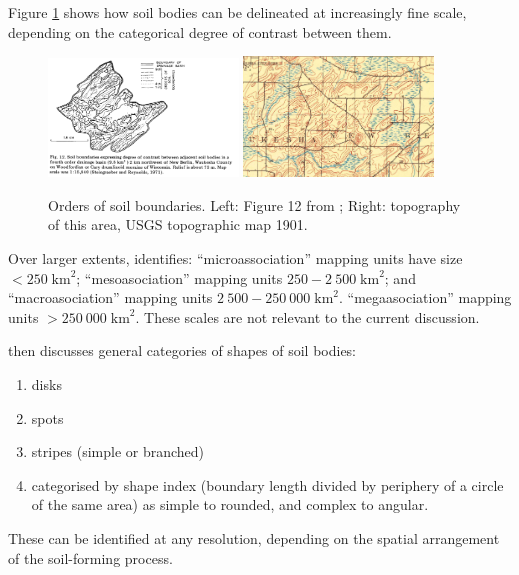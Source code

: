 \documentclass[soil, manuscript]{copernicus}
\begin{document}
\par
Figure \ref{fig:hole12} shows how soil bodies can be delineated at increasingly fine scale, depending on the categorical degree of contrast between them.

\begin{figure}
  \centering
  \includegraphics[width=0.45\textwidth]{10.1016.0016-7061(78)90002-2_Fig12.png}
  \hfill
  \includegraphics[width=0.45\textwidth]{10.1016.0016-7061(78)90002-2_Fig12_topo1901.png}
  \caption{Orders of soil boundaries. Left: Figure 12 from \citep{holeApproachLandscapeAnalysis1978}; Right: topography of this area, USGS topographic map 1901.}
  \label{fig:hole12}
\end{figure}


\par
Over larger extents, \citet[Table 5]{holeApproachLandscapeAnalysis1978} identifies:
%
``microassociation'' mapping units have size $<250 \; \mathrm{km}^2$;
%
``mesoasociation'' mapping units $250-2~500 \; \mathrm{km}^2$; and
%
``macroasociation'' mapping units  $2~500 - 250~000 \;\mathrm{km}^2$.
%
``megaasociation'' mapping units  $> 250~000 \; \mathrm{km}^2$.
%
These scales are not relevant to the current discussion.

\par
\citet[Figure 5]{holeApproachLandscapeAnalysis1978}  then discusses general categories of shapes of soil bodies:
\begin{enumerate}
\item disks
\item spots
\item stripes (simple or branched)
\item categorised by shape index (boundary length divided by periphery of a circle of the same area) as simple to rounded, and complex to angular.
\end{enumerate}
%
These can be identified at any resolution, depending on the spatial arrangement of the soil-forming process.
\end{document}
